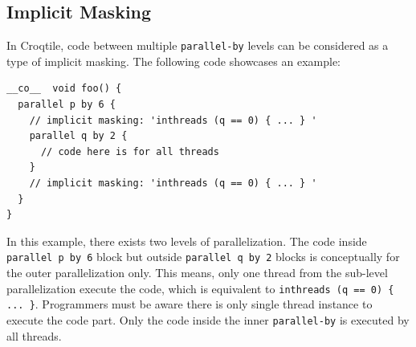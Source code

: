 \subsection*{Implicit Masking}

In Croqtile, code between multiple \texttt{parallel-by} levels can be considered as a type of implicit masking. The following code showcases an example:

\begin{lstlisting}[language=croqtile,caption={Implicit Masking}]
__co__  void foo() {
  parallel p by 6 {
    // implicit masking: 'inthreads (q == 0) { ... } '
    parallel q by 2 {
      // code here is for all threads
    }
    // implicit masking: 'inthreads (q == 0) { ... } '
  }
}
\end{lstlisting}

In this example, there exists two levels of parallelization. The code inside \texttt{parallel p by 6} block but outside \texttt{parallel q by 2} blocks is conceptually for the outer parallelization only. This means, only one thread from the sub-level parallelization execute the code, which is equivalent to \texttt{inthreads (q == 0) \{ .\allowbreak{}.\allowbreak{}.\allowbreak{} \}}. Programmers must be aware there is only single thread instance to execute the code part. Only the code inside the inner \texttt{parallel-by} is executed by all threads.
